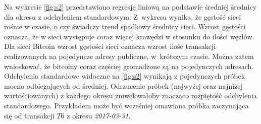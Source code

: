 \documentclass[12pt, twoside, final, openany]{mgr}
\begin{document}
\indent Na wykresie \ref{fig:s2} przedstawiono regresję liniową na podstawie średniej średnicy dla okresu z odchyleniem standardowym. Z~wykresu wynika, że gęstość sieci rośnie w czasie, o czy świadczy trend spadkowy średnicy sieci. Wzrost gęstości oznacza, że w sieci występuje coraz więcej krawędzi w stosunku do ilości węzłów. Dla sieci Bitcoin wzrost gęstości sieci oznacza wzrost ilość transakcji realizowanych na pojedyncze adresy publiczne, w~krótszym czasie. Można zatem wnioskować, że bitcoiny coraz częściej gromadzone są na pojedynczych adresach. Odchylenia standardowe widoczne na \ref{fig:s2} wynikają z pojedynczych próbek mocno odbiegających od średniej. Odrzucenie próbek (najwyżej oraz najniżej wartościowanych) z każdego okresu zniwelowałoby znacząco rozpiętość odchylenia standardowego. Przykładem może być wcześniej omawiana próbka zaczynająca się od transakcji $T6$ z okresu \textit{2017-03-31}. 
\end{document}
